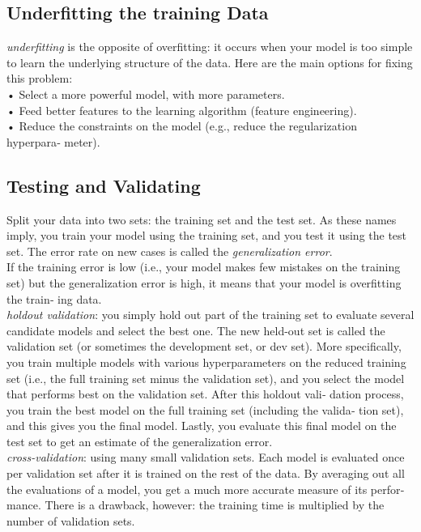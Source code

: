 \subsection*{Underfitting the training Data}
\textit{underfitting} is the opposite of overfitting: it occurs when your
model is too simple to learn the underlying structure of the data.
Here are the main options for fixing this problem:\\
• Select a more powerful model, with more parameters.\\
• Feed better features to the learning algorithm (feature engineering).\\
• Reduce the constraints on the model (e.g., reduce the regularization hyperpara‐
meter).\\

\subsection*{Testing and Validating}
Split your data into two sets: the training set and the test set. As these names imply, you train your model using the training set, and you test it using
the test set. The error rate on new cases is called the \textit{generalization error}.\\
If the training error is low (i.e., your model makes few mistakes on the training set)
but the generalization error is high, it means that your model is overfitting the train‐
ing data.\\
\textit{holdout validation}: you simply hold out
part of the training set to evaluate several candidate models and select the best one.
The new held-out set is called the validation set (or sometimes the development set, or
dev set). More specifically, you train multiple models with various hyperparameters
on the reduced training set (i.e., the full training set minus the validation set), and
you select the model that performs best on the validation set. After this holdout vali‐
dation process, you train the best model on the full training set (including the valida‐
tion set), and this gives you the final model. Lastly, you evaluate this final model on
the test set to get an estimate of the generalization error.\\
\textit{cross-validation}: using many small validation sets. Each model is evaluated
once per validation set after it is trained on the rest of the data. By averaging out all
the evaluations of a model, you get a much more accurate measure of its perfor‐
mance. There is a drawback, however: the training time is multiplied by the number
of validation sets.












